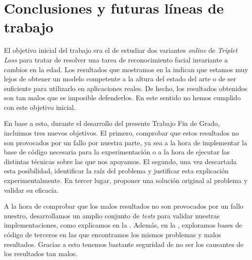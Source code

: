 \chapter{Conclusiones y futuras líneas de trabajo} \label{ich:conclusiones}

El objetivo inicial del trabajo era el de estudiar dos variantes \textit{online} de \textit{Triplet Loss} para tratar de resolver una tarea de reconocimiento facial invariante a cambios en la edad. Los resultados que mostramos en la \tableref{} indican que estamos muy lejos de obtener un modelo competente a la altura del estado del arte o de ser suficiente para utilizarlo en aplicaciones reales. De hecho, los resultados obtenidos son tan malos que es imposible defenderlos. En este sentido no hemos cumplido con este objetivo inicial.

En base a esto, durante el desarrollo del presente Trabajo Fin de Grado, incluimos tres nuevos objetivos. El primero, comprobar que estos resultados no son provocados por un fallo por nuestra parte, ya sea a la hora de implementar la base de código necesaria para la experimentación o a la hora de ejecutar las distintas técnicas sobre las que nos apoyamos. El segundo, una vez descartada esta posibilidad, identificar la raíz del problema y justificar esta explicación experimentalmente. En tercer lugar, proponer una solución original al problema y validar su eficacia.

A la hora de comprobar que los malos resultados no son provocados por un fallo nuestro, desarrollamos un amplio conjunto de \textit{tests} para validar nuestras implementaciones, como explicamos en la \sectionref{}. Además, en la \sectionref{}, exploramos bases de código de terceros en las que encontramos los mismos problemas y malos resultados. Gracias a esto tenemos bastante seguridad de no ser los causantes de los resultados tan malos.

